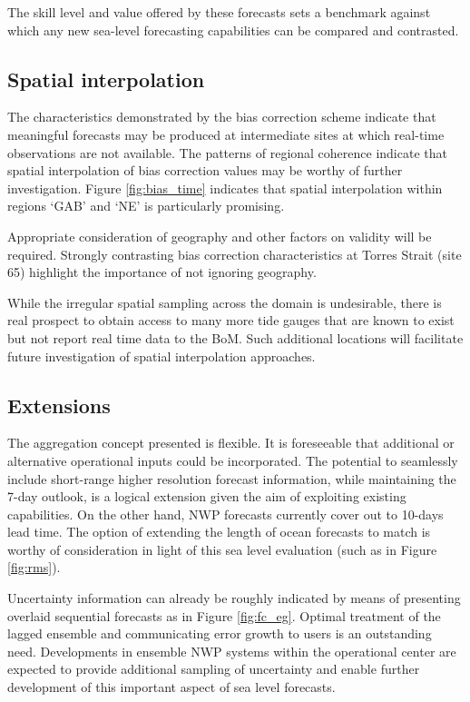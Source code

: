 The skill level and value offered by these forecasts sets a benchmark against which any new sea-level forecasting capabilities can be compared and contrasted.  

\subsection{Spatial interpolation}
The characteristics demonstrated by the bias correction scheme indicate that meaningful forecasts may be produced at intermediate sites at which real-time observations are not available.
The patterns of regional coherence indicate that spatial interpolation of bias correction values may be worthy of further investigation.
Figure \ref{fig:bias_time} indicates that spatial interpolation within regions `GAB' and `NE' is particularly promising.

Appropriate consideration of geography and other factors on validity will be required.
Strongly contrasting bias correction characteristics at Torres Strait (site 65) highlight the importance of not ignoring geography.

While the irregular spatial sampling across the domain is undesirable, there is real prospect to obtain access to many more tide gauges that are known to exist but not report real time data to the BoM.   
Such additional locations will facilitate future investigation of spatial interpolation approaches.    


\subsection{Extensions}
The aggregation concept presented is flexible.
It is foreseeable that additional or alternative operational inputs could be incorporated. 
The potential to seamlessly include short-range higher resolution forecast information, while maintaining the 7-day outlook, is a logical extension given the aim of exploiting existing capabilities.
On the other hand, NWP forecasts currently cover out to 10-days lead time. The option of extending the length of ocean forecasts to match is worthy of consideration in light of this sea level evaluation (such as in Figure \ref{fig:rms}).

Uncertainty information can already be roughly indicated by means of presenting overlaid sequential forecasts as in Figure \ref{fig:fc_eg}.
Optimal treatment of the lagged ensemble and communicating error growth to users is an outstanding need.
Developments in ensemble NWP systems within the operational center are expected to provide additional sampling of uncertainty and enable further development of this important aspect of sea level forecasts.  

